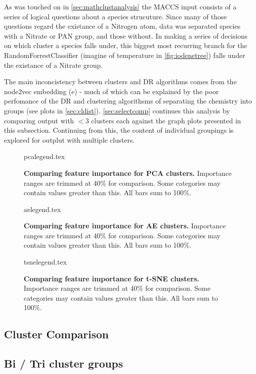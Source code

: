  As was touched on  in \autoref{sec:mathclustanalysis} the MACCS input consists of a series of logical questions about a species strucuture. Since many of those questions regard the existance of a Nitrogen atom, data was separated species with a Nitrate or PAN group, and those without. In making a series of decisions on which cluster a species falls under, this biggest most recurring branch for the RandomForrestClassifier (imagine of temperature in \autoref{fig:iodenetree}) falls under the existance of a Nitrate group.

 The main inconcistency between clusters and DR algorithms comes from the node2vec embedding (e) - much of which can be explained by the poor perfomance of the DR and clustering algorithsms of separating the chemistry into groups (see plots in \autoref{sec:cldist}). \autoref{sec:selectcomp} continues this analysis by comparing output with $<3$ clusters each against the graph plots presented in this subsection. Continuing from this, the content of individual groupings is explored for outplut with multiple clusters.


\begin{figure}[H]
    {pcalegend.tex}
    \caption{\textbf{Comparing feature importance for PCA clusters.} Importance ranges are trimmed at 40\% for comparison. Some categories may contain values greater than this. All bars sum to 100\%.}
    \label{fig:pcalegend}
\end{figure}
\begin{figure}[H]
    {aelegend.tex}
    \caption{\textbf{Comparing feature importance for AE clusters.} Importance ranges are trimmed at 40\% for comparison. Some categories may contain values greater than this. All bars sum to 100\%. }
    \label{fig:aelegend}
\end{figure}
\begin{figure}[H]
    {tsnelegend.tex}
    \caption{\textbf{Comparing feature importance for t-SNE clusters.} Importance ranges are trimmed at 40\% for comparison. Some categories may contain values greater than this. All bars sum to 100\%.}
    \label{fig:tsnelegend}
\end{figure}


\subsection{Cluster Comparison}\label{sec:selectcomp}

\subsection{Bi / Tri cluster groups }

